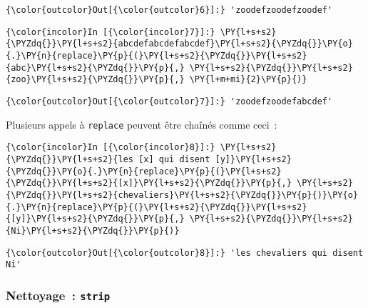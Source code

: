 \begin{Verbatim}[commandchars=\\\{\},frame=single,framerule=0.3mm,rulecolor=\color{cellframecolor}]
{\color{outcolor}Out[{\color{outcolor}6}]:} 'zoodefzoodefzoodef'
\end{Verbatim}
            
    \begin{Verbatim}[commandchars=\\\{\},frame=single,framerule=0.3mm,rulecolor=\color{cellframecolor}]
{\color{incolor}In [{\color{incolor}7}]:} \PY{l+s+s2}{\PYZdq{}}\PY{l+s+s2}{abcdefabcdefabcdef}\PY{l+s+s2}{\PYZdq{}}\PY{o}{.}\PY{n}{replace}\PY{p}{(}\PY{l+s+s2}{\PYZdq{}}\PY{l+s+s2}{abc}\PY{l+s+s2}{\PYZdq{}}\PY{p}{,} \PY{l+s+s2}{\PYZdq{}}\PY{l+s+s2}{zoo}\PY{l+s+s2}{\PYZdq{}}\PY{p}{,} \PY{l+m+mi}{2}\PY{p}{)}
\end{Verbatim}


\begin{Verbatim}[commandchars=\\\{\},frame=single,framerule=0.3mm,rulecolor=\color{cellframecolor}]
{\color{outcolor}Out[{\color{outcolor}7}]:} 'zoodefzoodefabcdef'
\end{Verbatim}
            
    Plusieurs appels à \texttt{replace} peuvent être chaînés comme ceci~:

    \begin{Verbatim}[commandchars=\\\{\},frame=single,framerule=0.3mm,rulecolor=\color{cellframecolor}]
{\color{incolor}In [{\color{incolor}8}]:} \PY{l+s+s2}{\PYZdq{}}\PY{l+s+s2}{les [x] qui disent [y]}\PY{l+s+s2}{\PYZdq{}}\PY{o}{.}\PY{n}{replace}\PY{p}{(}\PY{l+s+s2}{\PYZdq{}}\PY{l+s+s2}{[x]}\PY{l+s+s2}{\PYZdq{}}\PY{p}{,} \PY{l+s+s2}{\PYZdq{}}\PY{l+s+s2}{chevaliers}\PY{l+s+s2}{\PYZdq{}}\PY{p}{)}\PY{o}{.}\PY{n}{replace}\PY{p}{(}\PY{l+s+s2}{\PYZdq{}}\PY{l+s+s2}{[y]}\PY{l+s+s2}{\PYZdq{}}\PY{p}{,} \PY{l+s+s2}{\PYZdq{}}\PY{l+s+s2}{Ni}\PY{l+s+s2}{\PYZdq{}}\PY{p}{)}
\end{Verbatim}


\begin{Verbatim}[commandchars=\\\{\},frame=single,framerule=0.3mm,rulecolor=\color{cellframecolor}]
{\color{outcolor}Out[{\color{outcolor}8}]:} 'les chevaliers qui disent Ni'
\end{Verbatim}
            
    \hypertarget{nettoyage-strip}{%
\subsubsection{\texorpdfstring{Nettoyage~:
\texttt{strip}}{Nettoyage~: strip}}\label{nettoyage-strip}}

